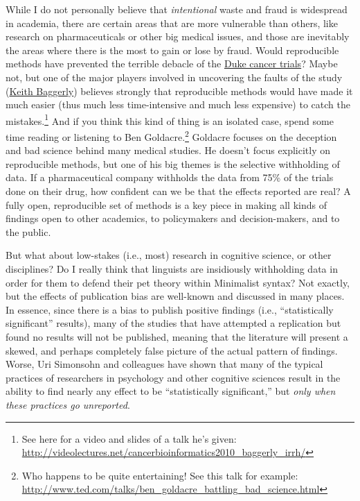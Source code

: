 \documentclass{book}
\begin{document}
While I do not personally believe that \emph{intentional} waste and fraud is widespread in academia, there are certain areas that are more vulnerable than others, like research on pharmaceuticals or other big medical issues, and those are inevitably the areas where there is the most to gain or lose by fraud. Would reproducible methods have prevented the terrible debacle of the \href{http://news.sciencemag.org/scienceinsider/2011/09/flawed-cancer-trial-at-duke-sparks.html}{Duke cancer trials}? Maybe not, but one of the major players involved in uncovering the faults of the study (\href{http://odin.mdacc.tmc.edu/~kabaggerly/}{Keith Baggerly}) believes strongly that reproducible methods would have made it much easier (thus much less time-intensive and much less expensive) to catch the mistakes.\footnote{See here for a video and slides of a talk he's given:\\ \href{http://videolectures.net/cancerbioinformatics2010_baggerly_irrh/}{http://videolectures.net/cancerbioinformatics2010\_baggerly\_irrh/}
 }  And if you think this kind of thing is an isolated case, spend some time reading or listening to Ben Goldacre.\footnote{Who happens to be quite entertaining!  See this talk for example:\\ \href{http://www.ted.com/talks/ben_goldacre_battling_bad_science.html}{http://www.ted.com/talks/ben\_goldacre\_battling\_bad\_science.html}
 } Goldacre focuses on the deception and bad science behind many medical studies. He doesn't focus explicitly on reproducible methods, but one of his big themes is the selective withholding of data. If a pharmaceutical company withholds the data from 75\% of the trials done on their drug, how confident can we be that the effects reported are real?  A fully open, reproducible set of methods is a key piece in making all kinds of findings open to other academics, to policymakers and decision-makers, and to the public.

But what about low-stakes (i.e., most) research in cognitive science, or other disciplines?  Do I really think that linguists are insidiously withholding data in order for them to defend their pet theory within Minimalist syntax?  Not exactly, but the effects of publication bias are well-known and discussed in many places. In essence, since there is a bias to publish positive findings (i.e., ``statistically significant'' results), many of the studies that have attempted a replication but found no results will not be published, meaning that the literature will present a skewed, and perhaps completely false picture of the actual pattern of findings.  Worse, Uri Simonsohn and colleagues \parencite[e.g.,][]{simmons2011false} have shown that many of the typical practices of researchers in psychology and other cognitive sciences result in the ability to find nearly any effect to be ``statistically significant,'' but \emph{only when these practices go unreported}.
\end{document}
